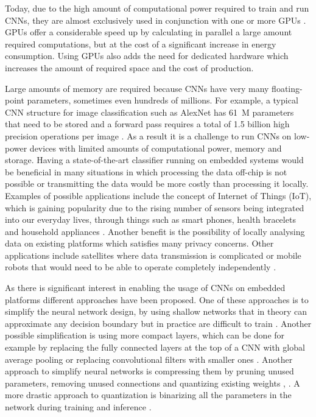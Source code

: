\documentclass[conference]{IEEEtran}
\begin{document}
Today, due to the high amount of computational power required to train and run CNNs, they are almost exclusively used in conjunction with one or more GPUs \cite{best1}. GPUs offer a considerable speed up by calculating in parallel a large amount required computations, but at the cost of a significant increase in energy consumption. Using GPUs also adds the need for dedicated hardware which increases the amount of required space and the cost of production.

Large amounts of memory are required because CNNs have very many floating-point parameters, sometimes even hundreds of millions. For example, a typical CNN structure for image classification such as AlexNet has \SI{61}{M} parameters that need to be stored and a forward pass requires a total of 1.5 billion high precision operations per image \cite{alexnet}. As a result it is a challenge to run CNNs on low-power devices with limited amounts of computational power, memory and storage. Having a state-of-the-art classifier running on embedded systems would be beneficial in many situations in which processing the data off-chip is not possible or transmitting the data would be more costly than processing it locally. Examples of possible applications include the concept of Internet of Things (IoT), which is gaining popularity due to the rising number of sensors being integrated into our everyday lives, through things such as smart phones, health bracelets and household appliances \cite{iot}. Another benefit is the possibility of locally analysing data on existing platforms which satisfies many privacy concerns. Other applications include satellites where data transmission is complicated or mobile robots that would need to be able to operate completely independently \cite{robots}.

As there is significant interest in enabling the usage of CNNs on embedded platforms different approaches have been proposed. One of these approaches is to simplify the neural network design, by using shallow networks that in theory can approximate any decision boundary but in practice are difficult to train \cite{deep}. Another possible simplification is using more compact layers, which can be done for example by replacing the fully connected layers at the top of a CNN with global average pooling \cite{compact1} or replacing convolutional filters with smaller ones \cite{compact2}. Another approach to simplify neural networks is compressing them by pruning unused parameters, removing unused connections and quantizing existing weights \cite{prune}, \cite{quantize}. A more drastic approach to quantization is binarizing all the parameters in the network during training and inference \cite{binary}.
\end{document}
